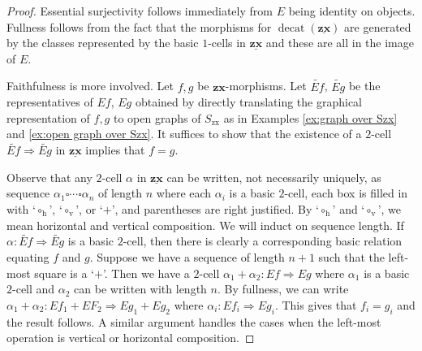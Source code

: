 \documentclass[]{amsart}
\theoremstyle{defn}
\begin{document}
\begin{proof}
	Essential surjectivity follows immediately from $E$ being identity on objects.  Fullness follows from the fact that the morphisms for $\operatorname{decat}(\underline{\mathbf{zx}})$ are generated by the classes represented by the basic $1$-cells in $\underline{\mathbf{zx}}$ and these are all in the image of $E$. 
	
	Faithfulness is more involved. Let $f,g$ be $\mathbf{zx}$-morphisms. Let $\widetilde{Ef}$, $\widetilde{Eg}$ be the representatives of $Ef$, $Eg$ obtained by directly translating the graphical representation of $f,g$ to open graphs of $S_{\text{zx}}$ as in Examples \ref{ex:graph over Szx}  and \ref{ex:open graph over Szx}. It suffices to show that the existence of a $2$-cell $\widetilde{Ef} \Rightarrow \widetilde{Eg}$ in $\underline{\mathbf{zx}}$ implies that $f=g$.  
	
	Observe that any $2$-cell $\alpha$ in $\underline{\mathbf{zx}}$ can be written, not necessarily uniquely, as sequence $\alpha_1 \square \dotsm \square \alpha_n$ of length $n$ where each $\alpha_i$ is a basic $2$-cell, each box is filled in with `$\circ_\text{h}$', `$\circ_\text{v}$', or `$+$', and parentheses are right justified.  By `$\circ_\text{h}$' and `$\circ_\text{v}$', we mean horizontal and vertical composition. We will induct on sequence length.  If $\alpha \colon \widetilde{Ef} \Rightarrow \widetilde{Eg}$ is a basic $2$-cell, then there is clearly a corresponding basic relation equating $f$ and $g$.  Suppose we have a sequence of length $n+1$ such that the left-most square is a `$+$'. Then we have a $2$-cell $\alpha_1 + \alpha_2 \colon Ef \Rightarrow Eg$ where $\alpha_1$ is a basic $2$-cell and $\alpha_2$ can be written with length $n$.   By fullness, we can write $\alpha_1 + \alpha_2 \colon Ef_1 + EF_2 \Rightarrow Eg_1 + Eg_2$ where $\alpha_i \colon Ef_i \Rightarrow Eg_i$.   This gives that $f_i = g_i$  and the result follows.  A similar argument handles the cases when the left-most operation is vertical or horizontal composition.
\end{proof}

%
%


%
\end{document}
